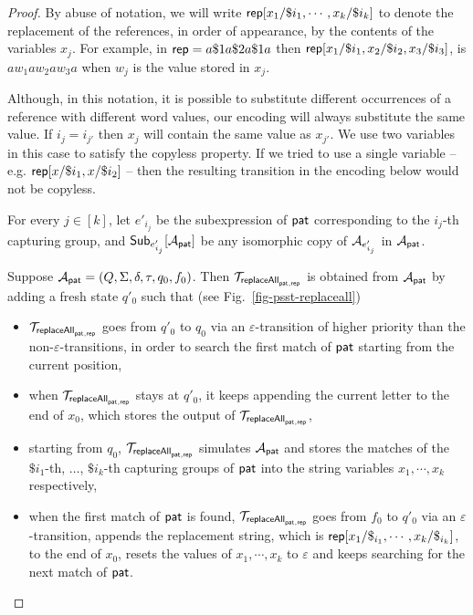 \begin{proof}
        By abuse of notation, we will write
        $\mathsf{rep}[x_1/\$i_1,\cdots,x_k/\$i_k]$
        to denote the replacement of the references, in order of appearance, by the contents of the variables $x_j$.
        For example, in
        $\mathsf{rep} = a \$1 a \$2 a \$1 a$
        then
        $\mathsf{rep}[x_1/\$i_1, x_2/\$i_2,x_3/\$i_3]$,
        is $a w_1 a w_2 a w_3 a$ when $w_j$ is the value stored in $x_j$.

        Although, in this notation, it is possible to substitute different occurrences of a reference with different word values, our encoding will always substitute the same value.
        If $i_j = i_{j'}$ then $x_j$ will contain the same value as $x_{j'}$.
        We use two variables in this case to satisfy the copyless property.
        If we tried to use a single variable – e.g. $\mathsf{rep}[x/\$i_1,x/\$i_2]$ – then the resulting transition in the encoding below would not be copyless.

        For every $j \in [k]$, let $e'_{i_j}$ be the subexpression of $\mathsf{pat}$ corresponding to the $i_j$-th capturing group, and ${\sf Sub}_{e'_{i_j}}[\mathcal{A}_{\mathsf{pat}}]$ be any isomorphic copy of $\mathcal{A}_{e'_{i_j}}$ in $\mathcal{A}_{\mathsf{pat}}$.

        Suppose $\mathcal{A}_{\mathsf{pat}} = (Q, \Sigma, \delta, \tau, q_0, f_0)$. Then $\mathcal{T}_{\mathsf{replaceAll}_{\mathsf{pat},\mathsf{rep}}}$ is obtained from $\mathcal{A}_{\mathsf{pat}}$ by adding a fresh state $q'_0$ such that (see Fig.~\ref{fig-psst-replaceall})
        \begin{itemize}
            \item $\mathcal{T}_{\mathsf{replaceAll}_{\mathsf{pat},\mathsf{rep}}}$ goes from $q'_0$ to $q_0$ via an $\varepsilon$-transition of higher priority than the non-$\varepsilon$-transitions, in order to search the first match of $\mathsf{pat}$ starting from the current position,
            \item when $\mathcal{T}_{\mathsf{replaceAll}_{\mathsf{pat},\mathsf{rep}}}$ stays at $q'_0$, it keeps appending the current letter to the end of $x_0$, which stores the output of $\mathcal{T}_{\mathsf{replaceAll}_{\mathsf{pat},\mathsf{rep}}}$,
            \item starting from $q_0$, $\mathcal{T}_{\mathsf{replaceAll}_{\mathsf{pat},\mathsf{rep}}}$ simulates $\mathcal{A}_{\mathsf{pat}}$ and stores the matches of the $\$i_1$-th, $\ldots$, $\$i_k$-th capturing groups of $\mathsf{pat}$ into the string variables $x_1, \cdots, x_k$ respectively,
            \item when the first match of $\mathsf{pat}$ is found, $\mathcal{T}_{\mathsf{replaceAll}_{\mathsf{pat},\mathsf{rep}}}$ goes from $f_0$ to $q'_0$ via an $\varepsilon$-transition, appends the replacement string, which is $\mathsf{rep}[x_1/\$_{i_1}, \cdots, x_k/\$_{i_k}]$, to the end of $x_0$, resets the values of $x_1,\cdots,x_k$ to $\varepsilon$ and keeps searching for the next match of $\mathsf{pat}$.
        \end{itemize}


\end{proof}
